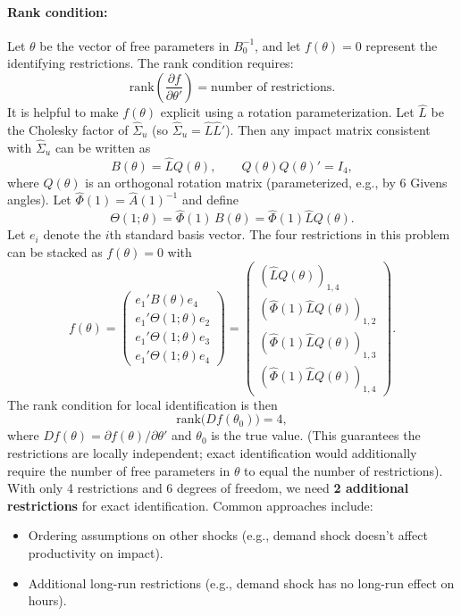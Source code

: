 \documentclass[12pt]{article}
\newcommand{\rank}{\mathrm{rank}}
\theoremstyle{definition}
\begin{document}
\paragraph{Rank condition:} Let $\theta$ be the vector of free parameters in $B_0^{-1}$, and let $f(\theta) = 0$ represent the identifying restrictions. The rank condition requires:
\[
\rank\left( \frac{\partial f}{\partial \theta'} \right) = \text{number of restrictions}.
\]
It is helpful to make $f(\theta)$ explicit using a rotation parameterization. Let $\hat{L}$ be the Cholesky factor of $\hat{\Sigma}_u$ (so $\hat{\Sigma}_u=\hat{L}\hat{L}'$). Then any impact matrix consistent with $\hat{\Sigma}_u$ can be written as
\[
B(\theta)=\hat{L}Q(\theta), \qquad Q(\theta)Q(\theta)'=I_4,
\]
where $Q(\theta)$ is an orthogonal rotation matrix (parameterized, e.g., by 6 Givens angles). Let $\hat{\Phi}(1)=\hat{A}(1)^{-1}$ and define
\[
\Theta(1;\theta)=\hat{\Phi}(1)\,B(\theta)=\hat{\Phi}(1)\hat{L}Q(\theta).
\]
Let $e_i$ denote the $i$th standard basis vector. The four restrictions in this problem can be stacked as $f(\theta)=0$ with
\[
f(\theta)=
\begin{pmatrix}
e_1'B(\theta)e_4\\
e_1'\Theta(1;\theta)e_2\\
e_1'\Theta(1;\theta)e_3\\
e_1'\Theta(1;\theta)e_4
\end{pmatrix}
=
\begin{pmatrix}
(\hat{L}Q(\theta))_{1,4}\\
(\hat{\Phi}(1)\hat{L}Q(\theta))_{1,2}\\
(\hat{\Phi}(1)\hat{L}Q(\theta))_{1,3}\\
(\hat{\Phi}(1)\hat{L}Q(\theta))_{1,4}
\end{pmatrix}.
\]
The rank condition for local identification is then
\[
\rank\big(Df(\theta_0)\big)=4,
\]
where $Df(\theta)=\partial f(\theta)/\partial\theta'$ and $\theta_0$ is the true value. (This guarantees the restrictions are locally independent; exact identification would additionally require the number of free parameters in $\theta$ to equal the number of restrictions). With only 4 restrictions and 6 degrees of freedom, we need \textbf{2 additional restrictions} for exact identification. Common approaches include:
\begin{itemize}
    \item Ordering assumptions on other shocks (e.g., demand shock doesn't affect productivity on impact).
    \item Additional long-run restrictions (e.g., demand shock has no long-run effect on hours).
\end{itemize}
\end{document}
